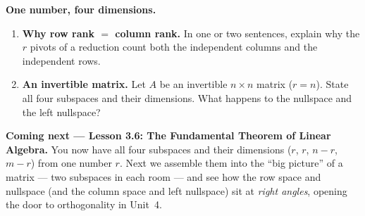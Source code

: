\documentclass[10pt]{article}
\begin{document}
\begin{extensionbox}
\textbf{One number, four dimensions.}
\begin{enumerate}[label=(\alph*), leftmargin=1.8em, itemsep=5pt]
  \item \textbf{Why row rank $=$ column rank.} In one or two sentences, explain why the $r$ pivots of a
        reduction count both the independent columns and the independent rows.
  \item \textbf{An invertible matrix.} Let $A$ be an invertible $n\times n$ matrix ($r=n$). State all four
        subspaces and their dimensions. What happens to the nullspace and the left nullspace?
\end{enumerate}
\end{extensionbox}

\begin{spiralbox}
\textbf{Coming next --- Lesson 3.6: The Fundamental Theorem of Linear Algebra.} You now have all four
subspaces and their dimensions ($r$, $r$, $n-r$, $m-r$) from one number $r$. Next we assemble them into the
``big picture'' of a matrix --- two subspaces in each room --- and see how the row space and nullspace (and
the column space and left nullspace) sit at \emph{right angles}, opening the door to orthogonality in Unit~4.
\end{spiralbox}
\end{document}
